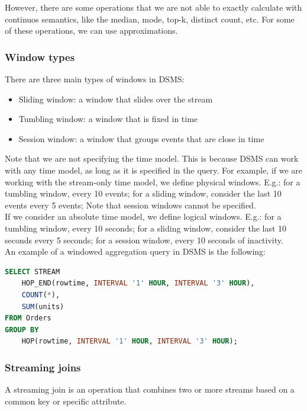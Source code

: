 However, there are some operations that we are not able to exactly 
calculate with continuos semantics, like the median, mode, top-k, distinct count, etc.
For some of these operations, we can use approximations.

\subsubsection{Window types}

There are three main types of windows in DSMS:

\begin{itemize}
    \item Sliding window: a window that slides over the stream
    \item Tumbling window: a window that is fixed in time
    \item Session window: a window that groups events that are close in time
\end{itemize}

Note that we are not specifying the time model. This is because DSMS can work with
any time model, as long as it is specified in the query. For example, if we are working
with the stream-only time model, we define physical windows. E.g.: for a tumbling window,
every 10 events; for a sliding window, consider the last 10 events every 5 events; Note
that session windows cannot be specified.\\

If we consider an absolute time model, we define logical windows. E.g.: for a tumbling
window, every 10 seconds; for a sliding window, consider the last 10 seconds every 5 seconds;
for a session window, every 10 seconds of inactivity.\\

An example of a windowed aggregation query in DSMS is the following:\\

\begin{lstlisting}[language=SQL]
SELECT STREAM
    HOP_END(rowtime, INTERVAL '1' HOUR, INTERVAL '3' HOUR),
    COUNT(*),
    SUM(units)
FROM Orders
GROUP BY 
    HOP(rowtime, INTERVAL '1' HOUR, INTERVAL '3' HOUR);
\end{lstlisting}

\subsubsection{Streaming joins}

A streaming join is an operation that combines two or more streams based on a common
key or specific attribute.\\

